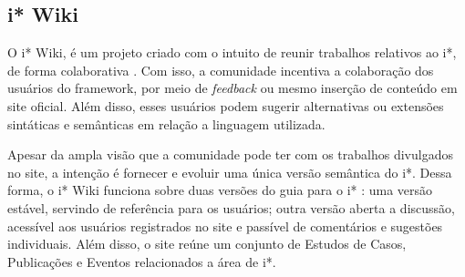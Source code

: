 

        \subsection{i* Wiki}
                O i* Wiki, é um projeto criado com o intuito de reunir trabalhos relativos ao i*, de forma colaborativa
                    \cite{site2013iwiki} \cite{leuf2001wiki}.
                Com isso, a comunidade incentiva a colaboração dos usuários do framework, por meio de \emph{feedback} ou mesmo inserção de conteúdo em site oficial.
                Além disso, esses usuários podem sugerir alternativas ou extensões sintáticas e semânticas em relação a linguagem utilizada.
            
                Apesar da ampla visão que a comunidade pode ter com os trabalhos divulgados no site, a intenção é fornecer e evoluir uma única versão semântica do i*.
                Dessa forma, o i* Wiki funciona sobre duas versões do guia para o i* \cite{site2013iwiki}:
                    uma versão estável, servindo de referência para os usuários;
                    outra versão aberta a discussão, acessível aos usuários registrados no site e passível de comentários e sugestões individuais.
                Além disso, o site reúne um conjunto de Estudos de Casos, Publicações e Eventos relacionados a área de i*.

